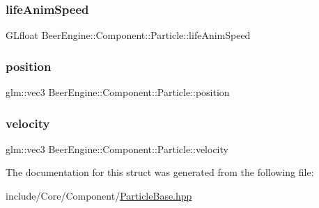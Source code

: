\subsubsection{\texorpdfstring{life\+Anim\+Speed}{lifeAnimSpeed}}
{\footnotesize\ttfamily G\+Lfloat Beer\+Engine\+::\+Component\+::\+Particle\+::life\+Anim\+Speed}

\mbox{\label{struct_beer_engine_1_1_component_1_1_particle_a23d67ee03aeae7d36af443d4a5073fc9}} 
\subsubsection{\texorpdfstring{position}{position}}
{\footnotesize\ttfamily glm\+::vec3 Beer\+Engine\+::\+Component\+::\+Particle\+::position}

\mbox{\label{struct_beer_engine_1_1_component_1_1_particle_ac9197940d7cd2b4b34fb031b81f7b766}} 
\subsubsection{\texorpdfstring{velocity}{velocity}}
{\footnotesize\ttfamily glm\+::vec3 Beer\+Engine\+::\+Component\+::\+Particle\+::velocity}



The documentation for this struct was generated from the following file\+:\begin{DoxyCompactItemize}
\item 
include/\+Core/\+Component/\mbox{\hyperlink{_particle_base_8hpp}{Particle\+Base.\+hpp}}\end{DoxyCompactItemize}
